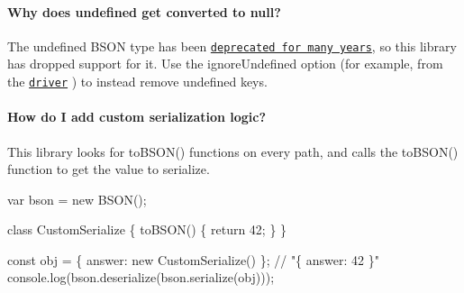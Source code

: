 \paragraph*{Why does {\ttfamily undefined} get converted to {\ttfamily null}?}

The {\ttfamily undefined} B\+S\+ON type has been \href{http://bsonspec.org/spec.html}{\tt deprecated for many years}, so this library has dropped support for it. Use the {\ttfamily ignore\+Undefined} option (for example, from the \href{http://mongodb.github.io/node-mongodb-native/2.2/api/MongoClient.html#connect}{\tt driver} ) to instead remove {\ttfamily undefined} keys.

\paragraph*{How do I add custom serialization logic?}

This library looks for {\ttfamily to\+B\+S\+O\+N()} functions on every path, and calls the {\ttfamily to\+B\+S\+O\+N()} function to get the value to serialize.


\begin{DoxyCode}
var bson = new BSON();

class CustomSerialize \{
  toBSON() \{
    return 42;
  \}
\}

const obj = \{ answer: new CustomSerialize() \};
// "\{ answer: 42 \}"
console.log(bson.deserialize(bson.serialize(obj)));
\end{DoxyCode}
 